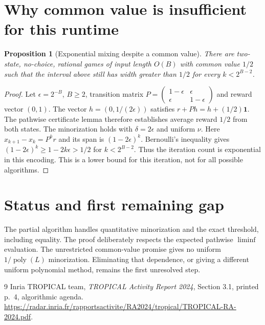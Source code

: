 \documentclass[11pt]{article}
\newtheorem{proposition}[theorem]{Proposition}
\theoremstyle{definition}
\begin{document}
\section{Why common value is insufficient for this runtime}
\begin{proposition}[Exponential mixing despite a common value]
There are two-state, no-choice, rational games of input length $O(B)$ with
common value $1/2$ such that the interval above still has width greater than
$1/2$ for every $k<2^{B-2}$.
\end{proposition}
\begin{proof}
Let $\epsilon=2^{-B}$, $B\geq2$, transition matrix
$P=\left(\begin{smallmatrix}1-\epsilon&\epsilon\\
\epsilon&1-\epsilon\end{smallmatrix}\right)$ and reward vector $(0,1)$.
The vector $h=(0,1/(2\epsilon))$ satisfies $r+Ph=h+(1/2)\mathbf1$.
The pathwise certificate lemma therefore establishes average reward $1/2$
from both states. The minorization holds with $\delta=2\epsilon$ and uniform
$\nu$.
Here $x_{k+1}-x_k=P^kr$ and its span is $(1-2\epsilon)^k$.
Bernoulli's inequality gives $(1-2\epsilon)^k\geq1-2k\epsilon>1/2$
for $k<2^{B-2}$. Thus the iteration count is exponential in this encoding.
This is a lower bound for this iteration, not for all possible algorithms.
\end{proof}

\section{Status and first remaining gap}
The partial algorithm handles quantitative minorization and the exact threshold,
including equality. The proof deliberately respects the expected pathwise
$\liminf$ evaluation. The unrestricted common-value promise gives no uniform
$1/\operatorname{poly}(L)$ minorization. Eliminating that dependence, or giving
a different uniform polynomial method, remains the first unresolved step.

\begin{thebibliography}{9}
 Inria TROPICAL team, \emph{TROPICAL Activity Report 2024},
Section 3.1, printed p.~4, algorithmic agenda.
\url{https://radar.inria.fr/rapportsactivite/RA2024/tropical/TROPICAL-RA-2024.pdf}.
\end{thebibliography}
\end{document}
